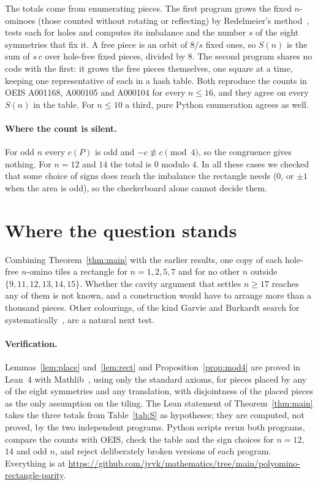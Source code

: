 \documentclass[11pt]{article}
\begin{document}
The totals come from enumerating pieces. The first program grows the fixed $n$-ominoes (those counted without
rotating or reflecting) by Redelmeier's method~\cite{Red81}, tests each for holes and computes its imbalance and the
number $s$ of the eight symmetries that fix it. A free piece is an orbit of $8/s$ fixed ones, so $S(n)$ is the sum of
$s\,c$ over hole-free fixed pieces, divided by $8$. The second program shares no code with the first: it grows
the free pieces themselves, one square at a time, keeping one representative of each in a hash table. Both reproduce
the counts in OEIS A001168, A000105 and A000104 for every $n\le16$, and they agree on every $S(n)$ in the table.
For $n\le10$ a third, pure Python enumeration agrees as well.

\paragraph{Where the count is silent.} For odd $n$ every $c(P)$ is odd and $-c\not\equiv c\pmod 4$, so the
congruence gives nothing. For $n=12$ and $14$ the total is $0$ modulo $4$. In all these cases we checked that some
choice of signs does reach the imbalance the rectangle needs ($0$, or $\pm1$ when the area is odd), so the
checkerboard alone cannot decide them.

\section{Where the question stands}

Combining Theorem~\ref{thm:main} with the earlier results, one copy of each hole-free $n$-omino tiles a rectangle
for $n=1,2,5,7$ and for no other $n$ outside $\{9,11,12,13,14,15\}$. Whether the cavity argument that settles
$n\ge17$ reaches any of them is not known, and a construction would have to arrange more than a thousand pieces. Other colourings, of the kind
Garvie and Burkardt search for systematically~\cite{GB22}, are a natural next test.

\paragraph{Verification.} Lemmas~\ref{lem:place} and~\ref{lem:rect} and Proposition~\ref{prop:mod4} are proved in
Lean~4 with Mathlib~\cite{mathlib}, using only the standard axioms, for pieces placed by any of the eight symmetries
and any translation, with disjointness of the placed pieces as the only assumption on the tiling. The Lean statement
of Theorem~\ref{thm:main} takes the three totals from Table~\ref{tab:S} as hypotheses; they are computed, not
proved, by the two independent programs. Python scripts rerun both programs, compare the counts with OEIS, check
the table and the sign choices for $n=12$, $14$ and odd $n$, and reject deliberately broken versions of each program.
Everything is at \url{https://github.com/jvvk/mathematics/tree/main/polyomino-rectangle-parity}.
\end{document}
